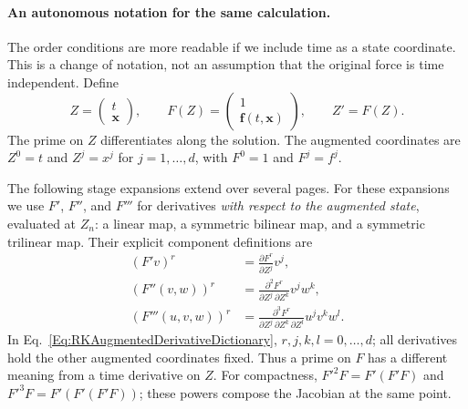 \paragraph{An autonomous notation for the same calculation.}
The order conditions are more readable if we include time as a state
coordinate. This is a change of notation, not an assumption that the
original force is time independent. Define
\begin{equation}\label{Eq:RKAugmentedSystem}
 Z=\begin{pmatrix}t\\\mathbf x\end{pmatrix},\qquad
 F(Z)=\begin{pmatrix}1\\\mathbf f(t,\mathbf x)\end{pmatrix},\qquad
 Z'=F(Z).
\end{equation}
The prime on $Z$ differentiates along the solution. The augmented
coordinates are $Z^0=t$ and $Z^j=x^j$ for $j=1,\dots,d$, with
$F^0=1$ and $F^j=f^j$.

The following stage expansions extend over several pages. For these
expansions we use $F'$, $F''$, and $F'''$ for derivatives
\emph{with respect to the augmented state}, evaluated at $Z_n$:
a linear map, a symmetric bilinear map, and a symmetric trilinear map.
Their explicit component definitions are
\begin{equation}\label{Eq:RKAugmentedDerivativeDictionary}
\begin{aligned}
 (F'v)^r
   &=\frac{\partial F^r}{\partial Z^j}v^j,\\
 (F''(v,w))^r
   &=
       \frac{\partial^2F^r}{\partial Z^j\,\partial Z^k}v^j w^k,\\
 (F'''(u,v,w))^r
   &=
       \frac{\partial^3F^r}{\partial Z^j\,\partial Z^k\,\partial Z^l}
       u^j v^k w^l.
\end{aligned}
\end{equation}
In Eq.~\ref{Eq:RKAugmentedDerivativeDictionary}, $r,j,k,l=0,\dots,d$;
all derivatives hold the other augmented coordinates fixed.
Thus a prime on $F$ has a different meaning from a time derivative
on $Z$.
For compactness, $F'^2F=F'(F'F)$ and $F'^3F=F'(F'(F'F))$;
these powers compose the Jacobian at the same point.

